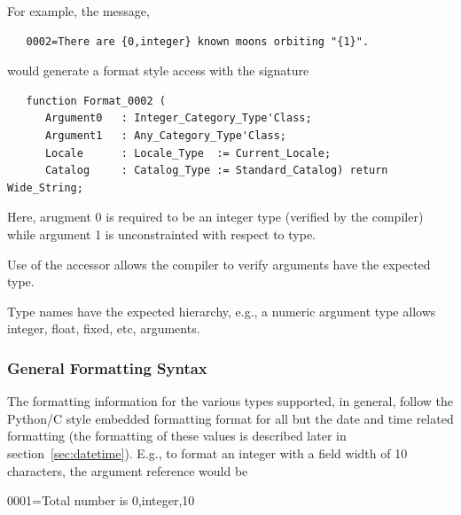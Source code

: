 For example, the message,
\begin{xmpl}
\begin{verbatim}
   0002=There are {0,integer} known moons orbiting "{1}".
\end{verbatim}
\end{xmpl}
would generate a format style access with the signature
\begin{xmpl}
\begin{verbatim}
   function Format_0002 (
      Argument0   : Integer_Category_Type'Class;
      Argument1   : Any_Category_Type'Class;
      Locale      : Locale_Type  := Current_Locale;
      Catalog     : Catalog_Type := Standard_Catalog) return Wide_String;
\end{verbatim}
\end{xmpl}
Here, arugment 0 is required to be an integer type (verified by the compiler)
while argument 1 is unconstrainted with respect to type.

Use of the accessor allows the compiler to verify arguments have the expected
type.

Type names have the expected hierarchy, e.g., a numeric argument type allows
integer, float, fixed, etc, arguments.

\subsubsection{General Formatting Syntax}

The formatting information for the various types supported, in general,
follow the Python/C style embedded formatting format for all but the date
and time related formatting (the formatting of these values is described
later in section~\ref{sec:datetime}).  E.g., to format an integer with a
field width of 10 characters, the argument reference would be
\begin{small}
   0001=Total number is {0,integer,10}
\end{small}

